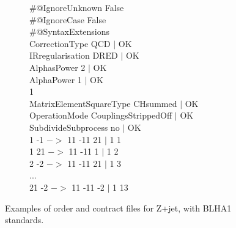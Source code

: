\begin{figure}[htb!]
\begin{subfigure}[]{0.49\textwidth}
{{\#@IgnoreUnknown False\\
\#@IgnoreCase False\\
\#@SyntaxExtensions \\
CorrectionType QCD $|$ OK\\
IRregularisation DRED $|$ OK\\
AlphasPower 2 $|$ OK\\
AlphaPower  1   $|$ OK\\           1\\
MatrixElementSquareType CHsummed $|$ OK\\
OperationMode CouplingsStrippedOff $|$ OK\\
SubdivideSubprocess  no $|$ OK\\
1 -1 $->$ 11 -11 21 $|$ 1 1\\
1 21 $->$ 11 -11 1  $|$ 1 2\\
2 -2 $->$ 11 -11 21 $|$ 1 3\\
...\\
21 -2 $->$ 11 -11 -2 $|$ 1 13\\}
}
\end{subfigure}
\caption{Examples of order and contract files for Z+jet, with BLHA1 standards.}
\label{fig:BLHA1}
\end{figure}  



